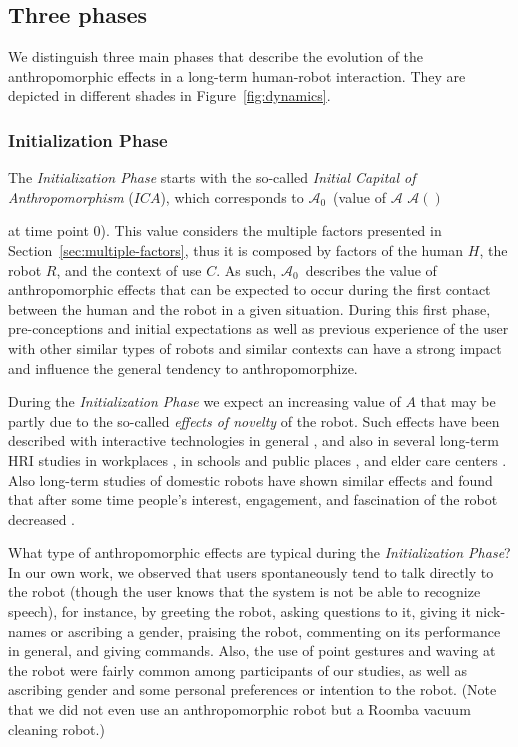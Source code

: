 \documentclass{frontiersSCNS} %
\newcommand{\Ant}[1][]{%
      \ifthenelse{\isempty{#1}}%
        {$\mathcal{A}$}
        {$\mathcal{A}(#1)$}
}
\newcommand{\ICA}{{$\mathcal{A}_0$~}}
\begin{document}
\subsection{Three phases}
\label{sec:phases}

We distinguish three main phases that describe the evolution of the
anthropomorphic effects in a long-term human-robot interaction. They are
depicted in different shades in Figure~\ref{fig:dynamics}.

\subsubsection{Initialization Phase\\}

The \textit{Initialization Phase} starts with the so-called \textit{Initial
Capital of Anthropomorphism} ($ICA$), which corresponds to \ICA (value of \Ant
at time point $0$). This value considers the multiple factors presented in
Section~\ref{sec:multiple-factors}, thus it is composed by factors of the human
$H$, the robot $R$, and the context of use $C$. As such, \ICA describes the
value of anthropomorphic effects that can be expected to occur during the first
contact between the human and the robot in a given situation. During this first
phase, pre-conceptions and initial expectations as well as previous experience
of the user with other similar types of robots and similar contexts can have a
strong impact and influence the general tendency to anthropomorphize.

During the \textit{Initialization Phase} we expect an increasing value of $A$
that may be partly due to the so-called \textit{effects of novelty} of the
robot. Such effects have been described with interactive technologies in general
\citep{rogers_diffusion_1995}, and also in several long-term HRI studies in
workplaces \citep{huttenrauch_fetch-and-carry_2003,mutlu_robots_2008}, in
schools and public places
\citep{gockley_designing_2005,kanda_communication_2005,kanda_interactive_2004},
and elder care centers \citep{sabelli_conversational_2011}. Also long-term
studies of domestic robots have shown similar effects and found that after some
time people's interest, engagement, and fascination of the robot decreased
\citep{sung_robots_2009,sung_domestic_2010,fernaeus_how_2010,fink_living_2013}.

What type of anthropomorphic effects are typical during the
\textit{Initialization Phase}? In our own work, we observed that users
spontaneously tend to talk directly to the robot (though the user knows that the
system is not be able to recognize speech), for instance, by greeting the robot,
asking questions to it, giving it nick-names or ascribing a gender, praising the
robot, commenting on its performance in general, and giving commands. Also, the
use of point gestures and waving at the robot were fairly common among
participants of our studies, as well as ascribing gender and some personal
preferences or intention to the robot. (Note that we did not even use an
anthropomorphic robot but a Roomba vacuum cleaning robot.)
\end{document}
